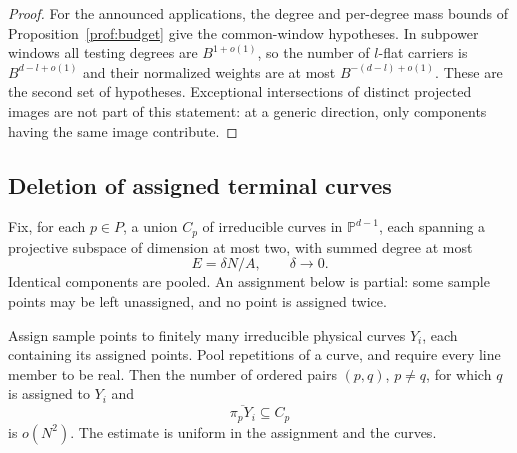 \begin{proof}
For the announced applications, the degree and per-degree mass bounds
of Proposition~\ref{prof:budget} give the common-window hypotheses.
In subpower windows all testing degrees are $B^{1+o(1)}$, so the
number of $l$-flat carriers is $B^{d-l+o(1)}$ and their normalized
weights are at most $B^{-(d-l)+o(1)}$. These are the second set of
hypotheses. Exceptional intersections of distinct projected images
are not part of this statement: at a generic direction, only
components having the same image contribute.
\end{proof}

\subsection{Deletion of assigned terminal curves}

Fix, for each $p\in P$, a union $C_p$ of irreducible curves in
$\mathbb P^{d-1}$, each spanning a projective subspace of dimension at
most two, with summed degree at most
\[
 E=\delta N/A,\qquad \delta\longrightarrow0.
\]
Identical components are pooled. An assignment below is partial:
some sample points may be left unassigned, and no point is assigned
twice.

\begin{proposition}\label{geo:terminal}
Assign sample points to finitely many irreducible physical curves
$Y_i$, each containing its assigned points. Pool repetitions of a
curve, and require every line member to be real. Then the number of
ordered pairs $(p,q)$, $p\ne q$, for which $q$ is assigned to $Y_i$
and
\[
 \overline{\pi_pY_i}\subseteq C_p
\]
is $o(N^2)$. The estimate is uniform in the assignment and the curves.
\end{proposition}

